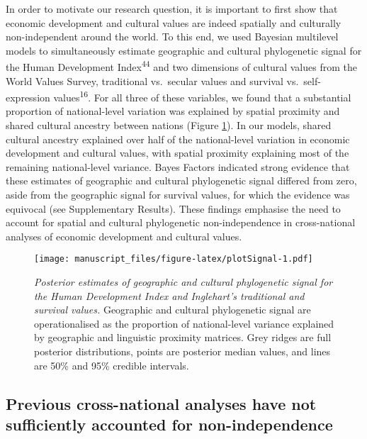 \documentclass[english,man,floatsintext]{apa6}
\begin{document}
In order to motivate our research question, it is important to first show that economic development and cultural values are indeed spatially and culturally non-independent around the world. To this end, we used Bayesian multilevel models to simultaneously estimate geographic and cultural phylogenetic signal for the Human Development Index\textsuperscript{44} and two dimensions of cultural values from the World Values Survey, traditional vs.~secular values and survival vs.~self-expression values\textsuperscript{16}. For all three of these variables, we found that a substantial proportion of national-level variation was explained by spatial proximity and shared cultural ancestry between nations (Figure \ref{fig:plotSignal}). In our models, shared cultural ancestry explained over half of the national-level variation in economic development and cultural values, with spatial proximity explaining most of the remaining national-level variance. Bayes Factors indicated strong evidence that these estimates of geographic and cultural phylogenetic signal differed from zero, aside from the geographic signal for survival values, for which the evidence was equivocal (see Supplementary Results). These findings emphasise the need to account for spatial and cultural phylogenetic non-independence in cross-national analyses of economic development and cultural values.



\begin{figure}
\centering
\texttt{[image: manuscript\_files/figure-latex/plotSignal-1.pdf]}
\caption{\label{fig:plotSignal}\emph{Posterior estimates of geographic and cultural phylogenetic signal for the Human Development Index and Inglehart's traditional and survival values.} Geographic and cultural phylogenetic signal are operationalised as the proportion of national-level variance explained by geographic and linguistic proximity matrices. Grey ridges are full posterior distributions, points are posterior median values, and lines are 50\% and 95\% credible intervals.}
\end{figure}

\hypertarget{previous-cross-national-analyses-have-not-sufficiently-accounted-for-non-independence}{%
\subsection{Previous cross-national analyses have not sufficiently accounted for non-independence}\label{previous-cross-national-analyses-have-not-sufficiently-accounted-for-non-independence}}
\end{document}
